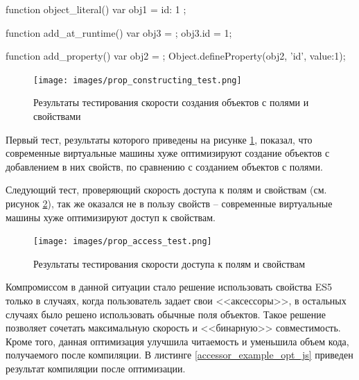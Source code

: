 \begin{code}
\begin{JavaScript}[caption=Тест производительности для сравнения скорости создания объектов с полем и свойством, label=prop_test]
function object_literal() {
	var obj1 = { id: 1 };
}

function add_at_runtime() {
    var obj3 = {};
    obj3.id = 1;
}

function add_property() {
    var obj2 = {};
    Object.defineProperty(obj2, 'id', {value:1});
}   
\end{JavaScript}
\end{code}

\begin{figure}[ht!]
\centering
\texttt{[image: images/prop\_constructing\_test.png]}
\caption{Результаты тестирования скорости создания объектов с полями и свойствами}
\label{prop_constructing_test}
\end{figure}

Первый тест, результаты которого приведены на рисунке \ref{prop_constructing_test}, показал, что современные виртуальные машины хуже оптимизируют создание объектов с добавлением в них свойств, по сравнению с созданием объектов с полями.

Следующий тест, проверяющий скорость доступа к полям и свойствам (см. рисунок \ref{prop_access_test}), так же оказался не в пользу свойств -- современные виртуальные машины хуже оптимизируют доступ к свойствам.

\begin{figure}[ht!]
\centering
\texttt{[image: images/prop\_access\_test.png]}
\caption{Результаты тестирования скорости доступа к полям и свойствам}
\label{prop_access_test}
\end{figure}

Компромиссом в данной ситуации стало решение использовать свойства ES5 только в случаях, когда пользователь задает свои <<аксессоры>>, в остальных случаях было решено использовать обычные поля объектов. Такое решение позволяет сочетать максимальную скорость и <<бинарную>> совместимость. Кроме того, данная оптимизация улучшила читаемость и уменьшила объем кода, получаемого после компиляции. В листинге \ref{accessor_example_opt_js} приведен результат компиляции после оптимизации.

\begin{code}
\end{code}


